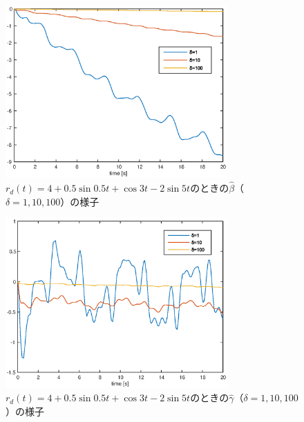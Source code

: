 \documentclass[a4paper,12pt]{jarticle}
\begin{document}
\begin{figure}[htb]
    \begin{center}
       \includegraphics[width=85mm]{fig/beta_h_rdsin.eps}
        \caption{$r_d(t)=4+0.5\sin 0.5t + \cos 3t - 2\sin 5t$のときの$\hat{\beta}$（$\delta=1,10,100$）の様子}
        \label{fig:beta_h_rdsin}
    \end{center}
\end{figure}
%
%
\begin{figure}[htb]
    \begin{center}
       \includegraphics[width=85mm]{fig/gamma_h_rdsin.eps}
        \caption{$r_d(t)=4+0.5\sin 0.5t + \cos 3t - 2\sin 5t$のときの$\hat{\gamma}$（$\delta=1,10,100$）の様子}
        \label{fig:gamma_h_rdsin}
    \end{center}
\end{figure}
%
\end{document}
